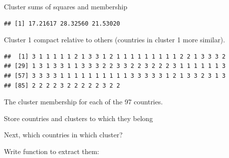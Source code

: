\documentclass[ignorenonframetext,]{beamer}
\newenvironment{Shaded}{\begin{snugshade}}{\end{snugshade}}
\newcommand{\ControlFlowTok}[1]{\textcolor[rgb]{0.13,0.29,0.53}{\textbf{#1}}}
\newcommand{\DataTypeTok}[1]{\textcolor[rgb]{0.13,0.29,0.53}{#1}}
\newcommand{\FloatTok}[1]{\textcolor[rgb]{0.00,0.00,0.81}{#1}}
\newcommand{\KeywordTok}[1]{\textcolor[rgb]{0.13,0.29,0.53}{\textbf{#1}}}
\newcommand{\NormalTok}[1]{#1}
\newcommand{\OperatorTok}[1]{\textcolor[rgb]{0.81,0.36,0.00}{\textbf{#1}}}
\newcommand{\StringTok}[1]{\textcolor[rgb]{0.31,0.60,0.02}{#1}}
\begin{document}
\begin{frame}[fragile]{Cluster sums of squares and membership}
\protect\hypertarget{cluster-sums-of-squares-and-membership}{}

\begin{Shaded}
\end{Shaded}

\begin{verbatim}
## [1] 17.21617 28.32560 21.53020
\end{verbatim}

Cluster 1 compact relative to others (countries in cluster 1 more
similar).

\begin{Shaded}
\end{Shaded}

\begin{verbatim}
##  [1] 3 1 1 1 1 1 2 1 3 3 1 2 1 1 1 1 1 1 1 1 1 2 2 1 3 3 3 2
## [29] 1 3 1 3 3 1 1 3 3 3 2 2 3 3 2 2 3 2 2 2 3 1 1 1 1 1 1 3
## [57] 3 3 3 3 1 1 1 1 1 1 1 1 1 1 3 3 3 3 3 1 2 1 3 3 2 3 1 3
## [85] 2 2 2 2 3 2 2 2 2 2 3 2 2
\end{verbatim}

The cluster membership for each of the 97 countries.

\end{frame}

\begin{frame}[fragile]{Store countries and clusters to which they
belong}
\protect\hypertarget{store-countries-and-clusters-to-which-they-belong}{}

\begin{Shaded}
\end{Shaded}

Next, which countries in which cluster?

Write function to extract them:

\begin{Shaded}
\end{Shaded}

\end{frame}
\end{document}
